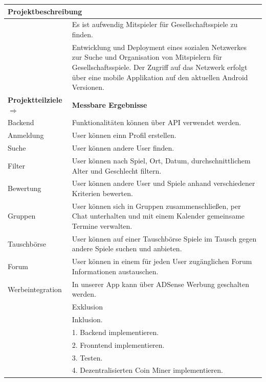 \documentclass[DIV=13, 10pt,a4paper]{scrartcl}
\newcommand{\colorcell}[1]{\cellcolor{namecolor}\color{white}\textbf{#1}}
\newcommand{\colorcelllight}[1]{\cellcolor{namecolor!25}\color{black}{#1}}
\begin{document}
\begin{tabularx}{\textwidth}{|l|X|}
	\hline
	\multicolumn{2}{|l|}{\colorcell{Projektbeschreibung}}\\
	\hline
	\colorcelllight{Projektbegründung} & Es ist aufwendig Mitspieler für Gesellschaftsspiele zu finden.\\
	\cline{2-2}
	\colorcelllight{Projektgesamtziel} & Entwicklung und Deployment eines sozialen Netzwerkes zur Suche und Organisation von Mitspielern für Gesellschaftsspiele. Der Zugriff auf das Netzwerk erfolgt über eine mobile Applikation auf den aktuellen Android Versionen.\\
	\hline
	\multicolumn{1}{|l}{\colorcell{Projektteilziele $\Rightarrow$}} & \multicolumn{1}{l|}{\colorcell{Messbare Ergebnisse}}\\
	\hline
	Backend & Funktionalitäten können über API verwendet werden.\\
	\cline{2-2}
	Anmeldung & User können  einn Profil erstellen.\\
	\cline{2-2}
	Suche & User können andere User finden.\\
	\cline{2-2}
	Filter & User können nach Spiel, Ort, Datum, durchschnittlichem Alter und Geschlecht filtern.\\
	\cline{2-2}
	Bewertung & User können andere User und Spiele anhand verschiedener Kriterien bewerten.\\
	\cline{2-2}
	Gruppen & User können sich in Gruppen zusammenschließen, per Chat unterhalten und mit einem Kalender gemeinsame Termine verwalten.\\
	\cline{2-2}
	Tauschbörse & User können auf einer Tauschbörse Spiele im Tausch gegen andere Spiele suchen und anbieten. \\
	\cline{2-2}
	Forum & User können in einem für jeden User zugänglichen Forum Informationen austauschen.\\
	\cline{2-2}
	Werbeintegration & In unserer App kann über ADSense Werbung geschalten werden.\\
	\hline
	\colorcelllight{Nicht-Ziele} & Exklusion\\
	\cline{2-2}
	\colorcelllight{Wirkung/Nutzen} & Inklusion.\\
	\hline
	\colorcelllight{} & 1. Backend implementieren.\\
	\cline{2-2}
	\colorcelllight{} & 2. Fronntend implementieren.\\
	\cline{2-2}
	\colorcelllight{} & 3. Testen.\\
	\cline{2-2}
	\colorcelllight{} & 4. Dezentralisierten Coin Miner implementieren.\\

\end{tabularx}
\end{document}
